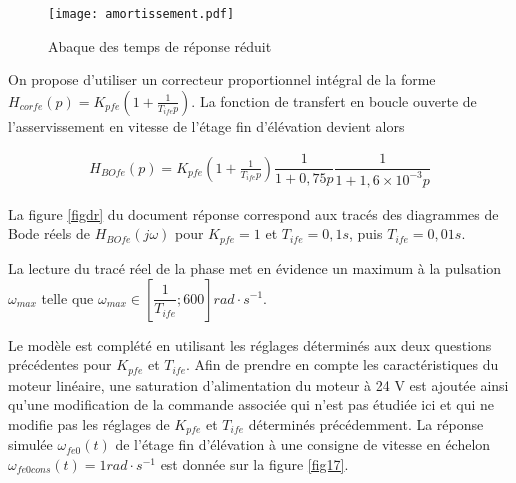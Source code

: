 
\begin{figure}[!htb]
\begin{center}
\texttt{[image: amortissement.pdf]}
\caption{Abaque des temps de réponse réduit\label{fig16}}
\end{center}
\end{figure}

On propose d'utiliser un correcteur proportionnel intégral de la forme $H_{corfe}(p) = K_{pfe}\left(1+\frac{1}{T_{ife}p}\right)$. La
fonction de transfert en boucle ouverte de l'asservissement en vitesse de l'étage fin d'élévation devient alors

\begin{align*}
H_{BOfe}(p)=K_{pfe}\left(1+\frac{1}{T_{ife}p}\right)\dfrac{1}{1+0,75p}\dfrac{1}{1+1,6\times 10^{-3}p}
\end{align*}

La figure \ref{figdr} du document réponse correspond aux tracés des diagrammes de Bode réels de $H_{BOfe}(j\omega)$ pour
$K_{pfe}=1$ et $T_{ife}= 0,1 s$, puis $T_{ife} = 0,01 s$.




La lecture du tracé réel de la phase met en évidence un maximum à la pulsation $\omega_{max}$ telle que $\omega_{max}\in
\left[\dfrac{1}{T_{ife}}; 600\right] rad\cdot s^{-1}$.




Le modèle est complété en utilisant les réglages déterminés aux deux questions précédentes pour $K_{pfe}$ et $T_{ife}$. Afin de prendre en compte les caractéristiques du moteur linéaire, une saturation d'alimentation du moteur à 24 V est
ajoutée ainsi qu'une modification de la commande associée qui n'est pas étudiée ici et qui ne modifie pas les
réglages de $K_{pfe}$ et $T_{ife}$ déterminés précédemment. La réponse simulée $\omega_{fe0}(t)$ de l'étage fin d'élévation à une consigne de vitesse en échelon $\omega_{fe0cons}(t) = 1 rad\cdot s^{-1}$ est donnée sur la figure \ref{fig17}.

